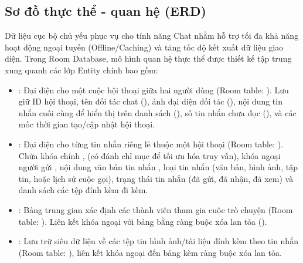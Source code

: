 \subsection{Sơ đồ thực thể - quan hệ (ERD)}
Dữ liệu cục bộ chủ yếu phục vụ cho tính năng Chat nhằm hỗ trợ tối đa khả năng hoạt động ngoại tuyến (Offline/Caching) và tăng tốc độ kết xuất dữ liệu giao diện. Trong Room Database, mô hình quan hệ thực thể được thiết kế tập trung xung quanh các lớp Entity chính bao gồm:
\begin{itemize}
    \item {}: Đại diện cho một cuộc hội thoại giữa hai người dùng (Room table: ). Lưu giữ ID hội thoại, tên đối tác chat (), ảnh đại diện đối tác (), nội dung tin nhắn cuối cùng để hiển thị trên danh sách (), số tin nhắn chưa đọc (), và các mốc thời gian tạo/cập nhật hội thoại.
    \item {}: Đại diện cho từng tin nhắn riêng lẻ thuộc một hội thoại (Room table: ). Chứa khóa chính ,  (có đánh chỉ mục  để tối ưu hóa truy vấn), khóa ngoại người gửi , nội dung văn bản tin nhắn , loại tin nhắn  (văn bản, hình ảnh, tập tin, hoặc lịch sử cuộc gọi), trạng thái tin nhắn  (đã gửi, đã nhận, đã xem) và danh sách các tệp đính kèm đi kèm.
    \item {}: Bảng trung gian xác định các thành viên tham gia cuộc trò chuyện (Room table: ). Liên kết khóa ngoại  với bảng  bằng ràng buộc xóa lan tỏa ().
    \item {}: Lưu trữ siêu dữ liệu về các tệp tin hình ảnh/tài liệu đính kèm theo tin nhắn (Room table: ), liên kết khóa ngoại  đến bảng  kèm ràng buộc xóa lan tỏa.
\end{itemize}

